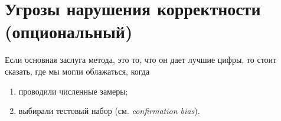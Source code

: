 
\section{Угрозы нарушения корректности (опциональный)}

Если основная заслуга метода, это то, что он дает лучшие цифры, то стоит сказать, где мы могли облажаться, когда
\begin{enumerate}
  \item проводили численные замеры;
  \item выбирали тестовый набор (см. \emph{confirmation bias}).
\end{enumerate}
